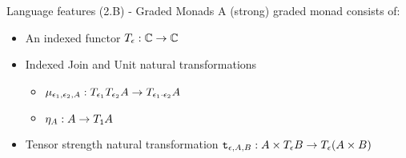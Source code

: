 \begin{frame}{Language features (2.B) - Graded Monads}
    A (strong) graded monad consists of:
        \begin{itemize}
            \setlength\itemsep{3em}
            \item An indexed functor $T_{\epsilon}{}: \mathbb{C}\rightarrow \mathbb{C}$
            \item Indexed Join and Unit natural transformations
            \begin{itemize}
                \item  $\mu_{\epsilon_1, \epsilon_2, A}: T_{\epsilon_1}{T_{\epsilon_2}{A}}\rightarrow T_{\epsilon_1\cdot \epsilon_2}{A}$\
                \item $\eta_{A}: A\rightarrow T_{\texttt{1}}{A}$
            \end{itemize}
            \item Tensor strength natural transformation $\texttt{t}_{\epsilon, A, B}: A\times T_{\epsilon}{B}\rightarrow T_{\epsilon}{(A\times B)}$
        \end{itemize}

\end{frame}